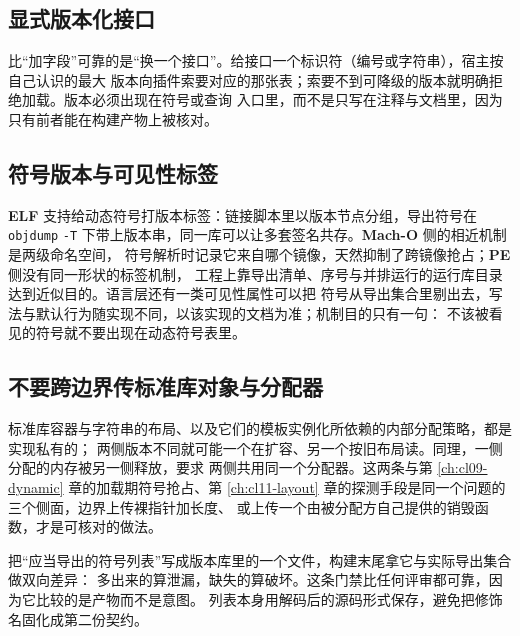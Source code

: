 \documentclass[12pt,a4paper,fontset=fandol]{ctexbook}
\newcommand{\Tool}[1]{\texttt{#1}}
\newcommand{\Sw}[1]{\texttt{#1}}
\newcommand{\Elf}{\textbf{\textsf{ELF}}}
\newcommand{\PeFmt}{\textbf{\textsf{PE}}}
\newcommand{\Macho}{\textbf{\textsf{Mach-O}}}
\begin{document}
\subsection{显式版本化接口}\label{sec:cl13-versioning}

比“加字段”可靠的是“换一个接口”。给接口一个标识符（编号或字符串），宿主按自己认识的最大
版本向插件索要对应的那张表；索要不到可降级的版本就明确拒绝加载。版本必须出现在符号或查询
入口里，而不是只写在注释与文档里，因为只有前者能在构建产物上被核对。

\subsection{符号版本与可见性标签}\label{sec:cl13-symversion}

\Elf{} 支持给动态符号打版本标签：链接脚本里以版本节点分组，导出符号在 \Tool{objdump}
\Sw{-T} 下带上版本串，同一库可以让多套签名共存。\Macho{} 侧的相近机制是两级命名空间，
符号解析时记录它来自哪个镜像，天然抑制了跨镜像抢占；\PeFmt{} 侧没有同一形状的标签机制，
工程上靠导出清单、序号与并排运行的运行库目录达到近似目的。语言层还有一类可见性属性可以把
符号从导出集合里剔出去，写法与默认行为随实现不同，以该实现的文档为准；机制目的只有一句：
不该被看见的符号就不要出现在动态符号表里。

\subsection{不要跨边界传标准库对象与分配器}\label{sec:cl13-no-std-across}

标准库容器与字符串的布局、以及它们的模板实例化所依赖的内部分配策略，都是实现私有的；
两侧版本不同就可能一个在扩容、另一个按旧布局读。同理，一侧分配的内存被另一侧释放，要求
两侧共用同一个分配器。这两条与第 \ref{ch:cl09-dynamic} 章的加载期符号抢占、第
\ref{ch:cl11-layout} 章的探测手段是同一个问题的三个侧面，边界上传裸指针加长度、
或上传一个由被分配方自己提供的销毁函数，才是可核对的做法。

\begin{bestpractice}[title={把对外符号集合当作契约来测}]
把“应当导出的符号列表”写成版本库里的一个文件，构建末尾拿它与实际导出集合做双向差异：
多出来的算泄漏，缺失的算破坏。这条门禁比任何评审都可靠，因为它比较的是产物而不是意图。
列表本身用解码后的源码形式保存，避免把修饰名固化成第二份契约。
\end{bestpractice}
\end{document}

